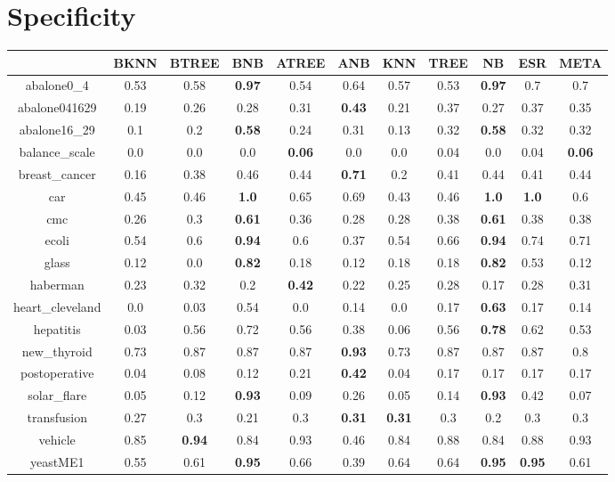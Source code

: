\documentclass{article}%
\begin{document}
\section*{Specificity}%
\begin{tabular}{c|cccccccccc}%
\hline%
&BKNN&BTREE&BNB&ATREE&ANB&KNN&TREE&NB&ESR&META\\%
\hline%
abalone0\_4&0.53&0.58&\textbf{0.97}&0.54&0.64&0.57&0.53&\textbf{0.97}&0.7&0.7\\%
\hline%
abalone041629&0.19&0.26&0.28&0.31&\textbf{0.43}&0.21&0.37&0.27&0.37&0.35\\%
\hline%
abalone16\_29&0.1&0.2&\textbf{0.58}&0.24&0.31&0.13&0.32&\textbf{0.58}&0.32&0.32\\%
\hline%
balance\_scale&0.0&0.0&0.0&\textbf{0.06}&0.0&0.0&0.04&0.0&0.04&\textbf{0.06}\\%
\hline%
breast\_cancer&0.16&0.38&0.46&0.44&\textbf{0.71}&0.2&0.41&0.44&0.41&0.44\\%
\hline%
car&0.45&0.46&\textbf{1.0}&0.65&0.69&0.43&0.46&\textbf{1.0}&\textbf{1.0}&0.6\\%
\hline%
cmc&0.26&0.3&\textbf{0.61}&0.36&0.28&0.28&0.38&\textbf{0.61}&0.38&0.38\\%
\hline%
ecoli&0.54&0.6&\textbf{0.94}&0.6&0.37&0.54&0.66&\textbf{0.94}&0.74&0.71\\%
\hline%
glass&0.12&0.0&\textbf{0.82}&0.18&0.12&0.18&0.18&\textbf{0.82}&0.53&0.12\\%
\hline%
haberman&0.23&0.32&0.2&\textbf{0.42}&0.22&0.25&0.28&0.17&0.28&0.31\\%
\hline%
heart\_cleveland&0.0&0.03&0.54&0.0&0.14&0.0&0.17&\textbf{0.63}&0.17&0.14\\%
\hline%
hepatitis&0.03&0.56&0.72&0.56&0.38&0.06&0.56&\textbf{0.78}&0.62&0.53\\%
\hline%
new\_thyroid&0.73&0.87&0.87&0.87&\textbf{0.93}&0.73&0.87&0.87&0.87&0.8\\%
\hline%
postoperative&0.04&0.08&0.12&0.21&\textbf{0.42}&0.04&0.17&0.17&0.17&0.17\\%
\hline%
solar\_flare&0.05&0.12&\textbf{0.93}&0.09&0.26&0.05&0.14&\textbf{0.93}&0.42&0.07\\%
\hline%
transfusion&0.27&0.3&0.21&0.3&\textbf{0.31}&\textbf{0.31}&0.3&0.2&0.3&0.3\\%
\hline%
vehicle&0.85&\textbf{0.94}&0.84&0.93&0.46&0.84&0.88&0.84&0.88&0.93\\%
\hline%
yeastME1&0.55&0.61&\textbf{0.95}&0.66&0.39&0.64&0.64&\textbf{0.95}&\textbf{0.95}&0.61\\%

\end{tabular}
\end{document}

